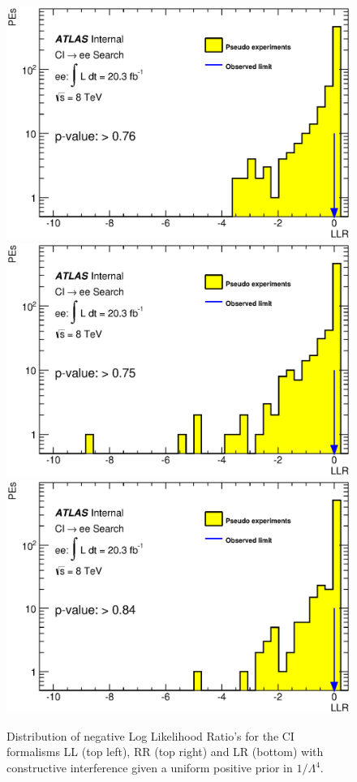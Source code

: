        \begin{figure}[h]
        \begin{center}
            \includegraphics[width=0.42\linewidth]{images/ee__LL_minus_L4/LLR.eps}
            \includegraphics[width=0.42\linewidth]{images/ee__RR_minus_L4/LLR.eps}
            \includegraphics[width=0.42\linewidth]{images/ee__LR_minus_L4/LLR.eps}
        \end{center}
       \caption{Distribution of negative Log Likelihood Ratio's for the CI formalisms LL (top left), RR (top right) and LR (bottom) with constructive interference given a uniform positive prior in $1/\Lambda^{4}$.}
       \label{fig:LLR_CI_con_4}
    \end{figure}



